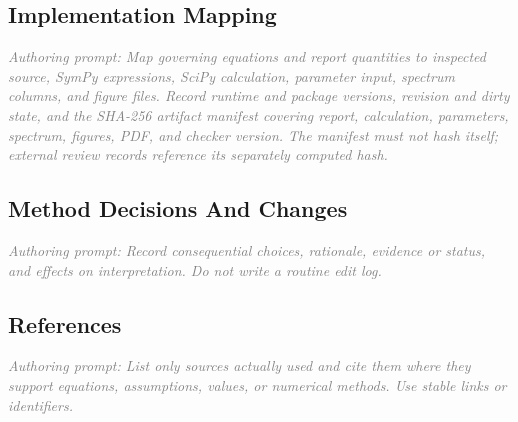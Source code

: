 \documentclass[11pt]{article}
\newcommand{\authorprompt}[1]{\textcolor{gray}{\emph{Authoring prompt: #1}}}
\begin{document}
\subsection{Implementation Mapping}

\authorprompt{Map governing equations and report quantities to inspected source, SymPy expressions, SciPy calculation, parameter input, spectrum columns, and figure files. Record runtime and package versions, revision and dirty state, and the SHA-256 artifact manifest covering report, calculation, parameters, spectrum, figures, PDF, and checker version. The manifest must not hash itself; external review records reference its separately computed hash.}

\subsection{Method Decisions And Changes}

\authorprompt{Record consequential choices, rationale, evidence or status, and effects on interpretation. Do not write a routine edit log.}

\subsection{References}

\authorprompt{List only sources actually used and cite them where they support equations, assumptions, values, or numerical methods. Use stable links or identifiers.}
\end{document}
